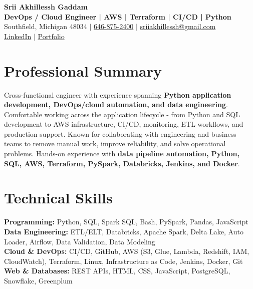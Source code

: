 \documentclass[letterpaper,10pt]{article}
\begin{document}
\fontsize{9.35pt}{10.45pt}\selectfont

\begin{center}
    {\LARGE \textbf{Srii Akhillessh Gaddam}} \\[-1pt]
    \textbf{DevOps / Cloud Engineer | AWS | Terraform | CI/CD | Python} \\[2pt]
    Southfield, Michigan 48034 $|$
    \href{tel:6468752400}{646-875-2400} $|$
    \href{mailto:sriiakhillessh@gmail.com}{sriiakhillessh@gmail.com} \\[1pt]
    \href{https://www.linkedin.com/in/srii-akhiilessh-gaddam-b48668191/}{LinkedIn} $|$
    \href{https://sriiakhillesshg.github.io/portfolio/}{Portfolio}
\end{center}
\vspace{-8pt}

\section{Professional Summary}
\small{Cross-functional engineer with experience spanning \textbf{Python application development, DevOps/cloud automation, and data engineering}. Comfortable working across the application lifecycle - from Python and SQL development to AWS infrastructure, CI/CD, monitoring, ETL workflows, and production support. Known for collaborating with engineering and business teams to remove manual work, improve reliability, and solve operational problems. Hands-on experience with \textbf{data pipeline automation, Python, SQL, AWS, Terraform, PySpark, Databricks, Jenkins, and Docker}.}

\section{Technical Skills}
\small{
\textbf{Programming:} Python, SQL, Spark SQL, Bash, PySpark, Pandas, JavaScript \\
\textbf{Data Engineering:} ETL/ELT, Databricks, Apache Spark, Delta Lake, Auto Loader, Airflow, Data Validation, Data Modeling \\
\textbf{Cloud \& DevOps:} CI/CD, GitHub, AWS (S3, Glue, Lambda, Redshift, IAM, CloudWatch), Terraform, Linux, Infrastructure as Code, Jenkins, Docker, Git \\
\textbf{Web \& Databases:} REST APIs, HTML, CSS, JavaScript, PostgreSQL, Snowflake, Greenplum
}
\end{document}
